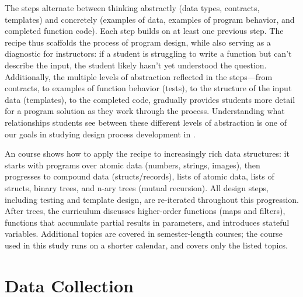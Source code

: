 The steps alternate between thinking abstractly (data types,
contracts, templates) and concretely (examples of data, examples of
program behavior, and completed function code). Each step builds on at
least one previous step. The recipe thus scaffolds the process of
program design, while also serving as a diagnostic for
instructors: if a student is struggling to write a function but can't
describe the input, the student likely
hasn't yet understood the question.
Additionally, the multiple levels of abstraction reflected in the
steps---from contracts, to examples of function behavior (tests),
to the structure of the input data (templates), to the completed code,
gradually provides students more detail for a program solution as they
work through the process. Understanding what relationships students see
between these different levels of abstraction is one of our goals in
studying design process development in \htdp.

An \htdp course shows how to apply the recipe to increasingly rich
data structures: it starts with programs over atomic data (numbers,
strings, images), then progresses to compound data (structs/records),
lists of atomic data, lists of structs, binary trees, and n-ary trees
(mutual recursion). All design steps, including testing and template
design, are re-iterated throughout this progression.  After trees, the
curriculum discusses higher-order functions (maps and filters),
functions that accumulate partial results in parameters, and
introduces stateful variables.  Additional topics are covered in
semester-length \htdp courses; the course used in this study runs on a
shorter calendar, and covers only the listed topics.

\section{Data Collection}
\label{s:data-collect}

